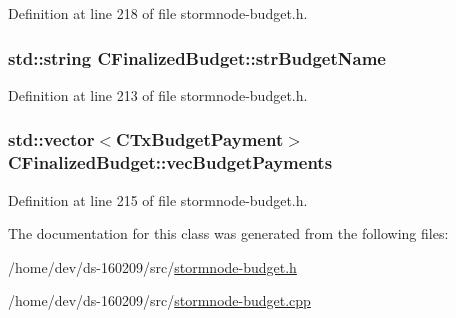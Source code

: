 Definition at line 218 of file stormnode-\/budget.\+h.

\hypertarget{class_c_finalized_budget_ae2a467abad2985ff3c32b29fc75500aa}{}
\subsubsection[{str\+Budget\+Name}]{\setlength{\rightskip}{0pt plus 5cm}std\+::string C\+Finalized\+Budget\+::str\+Budget\+Name}\label{class_c_finalized_budget_ae2a467abad2985ff3c32b29fc75500aa}


Definition at line 213 of file stormnode-\/budget.\+h.

\hypertarget{class_c_finalized_budget_a639e7be9254d99deb42aeeb15de63174}{}
\subsubsection[{vec\+Budget\+Payments}]{\setlength{\rightskip}{0pt plus 5cm}std\+::vector$<${\bf C\+Tx\+Budget\+Payment}$>$ C\+Finalized\+Budget\+::vec\+Budget\+Payments}\label{class_c_finalized_budget_a639e7be9254d99deb42aeeb15de63174}


Definition at line 215 of file stormnode-\/budget.\+h.



The documentation for this class was generated from the following files\+:\begin{DoxyCompactItemize}
\item 
/home/dev/ds-\/160209/src/\hyperlink{stormnode-budget_8h}{stormnode-\/budget.\+h}\item 
/home/dev/ds-\/160209/src/\hyperlink{stormnode-budget_8cpp}{stormnode-\/budget.\+cpp}\end{DoxyCompactItemize}
